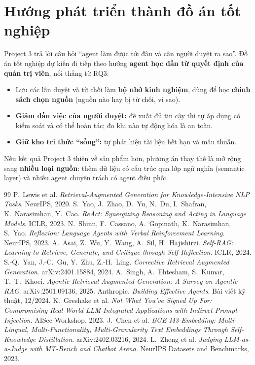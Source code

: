 \documentclass[11pt,a4paper]{article}
\begin{document}
\section{Hướng phát triển thành đồ án tốt nghiệp}
Project 3 trả lời câu hỏi ``agent làm được tới đâu và cần người duyệt ra sao''. Đồ án tốt nghiệp dự kiến đi
tiếp theo hướng \textbf{agent học dần từ quyết định của quản trị viên}, nối thẳng từ RQ3:
\begin{itemize}
  \item Lưu các lần duyệt và từ chối làm \textbf{bộ nhớ kinh nghiệm}, dùng để học \textbf{chính sách chọn
        nguồn} (nguồn nào hay bị từ chối, vì sao).
  \item \textbf{Giảm dần việc của người duyệt:} đề xuất đủ tin cậy thì tự áp dụng có kiểm soát và có thể hoàn
        tác; đo khi nào tự động hóa là an toàn.
  \item \textbf{Giữ kho tri thức ``sống'':} tự phát hiện tài liệu hết hạn và mâu thuẫn.
\end{itemize}
Nếu kết quả Project 3 thiên về sản phẩm hơn, phương án thay thế là mở rộng sang \textbf{nhiều loại nguồn}:
thêm dữ liệu có cấu trúc qua lớp ngữ nghĩa (semantic layer) và nhiều agent chuyên trách có agent điều phối.

\begin{thebibliography}{99}\small
{} P.~Lewis et al. \emph{Retrieval-Augmented Generation for Knowledge-Intensive NLP Tasks}. NeurIPS, 2020.
 S.~Yao, J.~Zhao, D.~Yu, N.~Du, I.~Shafran, K.~Narasimhan, Y.~Cao. \emph{ReAct: Synergizing Reasoning and Acting in Language Models}. ICLR, 2023.
 N.~Shinn, F.~Cassano, A.~Gopinath, K.~Narasimhan, S.~Yao. \emph{Reflexion: Language Agents with Verbal Reinforcement Learning}. NeurIPS, 2023.
 A.~Asai, Z.~Wu, Y.~Wang, A.~Sil, H.~Hajishirzi. \emph{Self-RAG: Learning to Retrieve, Generate, and Critique through Self-Reflection}. ICLR, 2024.
 S.-Q.~Yan, J.-C.~Gu, Y.~Zhu, Z.-H.~Ling. \emph{Corrective Retrieval Augmented Generation}. arXiv:2401.15884, 2024.
 A.~Singh, A.~Ehtesham, S.~Kumar, T.~T.~Khoei. \emph{Agentic Retrieval-Augmented Generation: A Survey on Agentic RAG}. arXiv:2501.09136, 2025.
 Anthropic. \emph{Building Effective Agents}. Bài viết kỹ thuật, 12/2024.
 K.~Greshake et al. \emph{Not What You've Signed Up For: Compromising Real-World LLM-Integrated Applications with Indirect Prompt Injection}. AISec Workshop, 2023.
 J.~Chen et al. \emph{BGE M3-Embedding: Multi-Lingual, Multi-Functionality, Multi-Granularity Text Embeddings Through Self-Knowledge Distillation}. arXiv:2402.03216, 2024.
 L.~Zheng et al. \emph{Judging LLM-as-a-Judge with MT-Bench and Chatbot Arena}. NeurIPS Datasets and Benchmarks, 2023.
\end{thebibliography}
\end{document}
